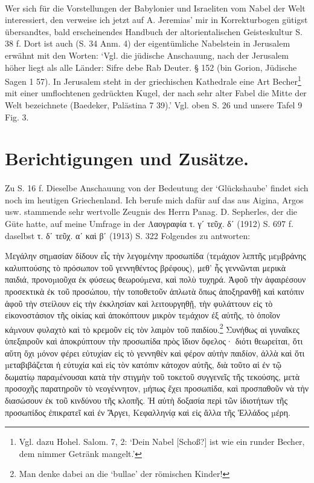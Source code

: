 \documentclass[a4paper, 11pt, oneside]{article}
\begin{document}
\paragraph{}
Wer sich für die Vorstellungen der Babylonier und Israeliten vom Nabel der Welt interessiert, den verweise ich jetzt auf A. Jeremias' mir in Korrekturbogen gütigst übersandtes, bald erscheinendes Handbuch der altorientalischen Geisteskultur S. 38 f. Dort ist auch (S. 34 Anm. 4) der eigentümliche Nabelstein in Jerusalem erwähnt mit den Worten: `Vgl. die jüdische Anschauung, nach der Jerusalem höher liegt als alle Länder: Sifre debe Rab Deuter. § 152 (bin Gorion, Jüdische Sagen 1 57). In Jerusalem steht in der griechischen Kathedrale eine Art Becher\footnote{Vgl. dazu Hohel. Salom. 7, 2: `Dein Nabel [Schoß?] ist wie ein runder Becher, dem nimmer Getränk mangelt.'} mit einer umflochtenen gedrückten Kugel, der nach sehr alter Fabel die Mitte der Welt bezeichnete (Baedeker, Palästina 7 39).' Vgl. oben S. 26 und unsere Tafel 9 Fig. 3.
\clearpage
\section{Berichtigungen und Zusätze.}
\paragraph{}
Zu S. 16 f. Dieselbe Anschauung von der Bedeutung der `Glückshaube' findet sich noch im heutigen Griechenland. Ich berufe mich dafür auf das aus Aigina, Argos usw. stammende sehr wertvolle Zeugnis des Herrn Panag. D. Sepherles, der die Güte hatte, auf meine Umfrage in der Λαογραφία τ. γʹ τεῦχ. δʹ (1912) S. 697 f. daselbst τ. δʹ τεῦχ. αʹ καὶ βʹ (1913) S. 322 Folgendes zu antworten:

Μεγάλην σηµασίαν δίδουν εἷς τὴν λεγομένην προσωπίδα (τεµάχιον λεπτῆς µεµβράνης καλυπτούσης τὸ πρόσωπον τοῦ γεννηθέντος βρέφους), μεθ' ἧς γεννῶνται μερικὰ παιδιά, προνοµιοῦχα ἐκ φύσεως θεωρούµενα, καὶ πολὺ τυχηρά. Ἀφοῦ τὴν ἀφαιρέσουν προσεκτικὰ ἐκ τοῦ προσώπου, τὴν τοποθετοῦν ἀπλωτὰ ὅπως ἀποξηρανθῇ καὶ κατόπιν ἀφοῦ τὴν στείλουν εἰς τὴν ἐκκλησίαν καὶ λειτουργηθῇ, τὴν φυλάττουν εἰς τὸ εἰκονοστάσιον τῆς οἰκίας καὶ ἀποκόπτουν μικρὸν τεµάχιον ἐξ αὐτῆς, τὸ ὁποῖον κάµνουν φυλαχτὸ καὶ τὸ κρεμοῦν εἰς τὸν λαιμὸν τοῦ παιδίου.\footnote{Man denke dabei an die `bullae' der römischen Kinder!} Συνήθως αἱ γυναῖκες ὑπεξαιροῦν καὶ ἀποκρύπτουν τὴν προσωπίδα πρὸς ἴδιον ὄφελος· διότι θεωρείται, ὅτι αὕτη ὄχι µόνον φέρει εὐτυχίαν εἰς τὸ γεννηθὲν καὶ φέρον αὐτὴν παιδίον, ἀλλὰ καὶ ὅτι µεταβιβάζεται ἡ εὐτυχία καὶ εἰς τὸν κατόπιν κάτοχον αὐτῆς, διὰ τοῦτο αἱ ἐν τῷ δωματίῳ παραµένουσαι κατὰ τὴν στιγμὴν τοῦ τοκετοῦ συγγενεῖς τῆς τεκούσης, μετὰ προσοχῆς παρατηροῦν τὸ νεογέννητον, µήπως ἔχει προσωπίδα, καὶ προσπαθοῦν νὰ τὴν διασώσουν ἐκ τοῦ κινδύνου τῆς κλοπῆς. Ἡ αὐτὴ δοξασία περὶ τῶν ἰδιοτήτων τῆς προσωπίδος ἐπικρατεῖ καὶ ἐν Ἄργει, Κεφαλληνίᾳ καὶ εἰς ἄλλα τῆς Ἑλλάδος µέρη.
\end{document}
